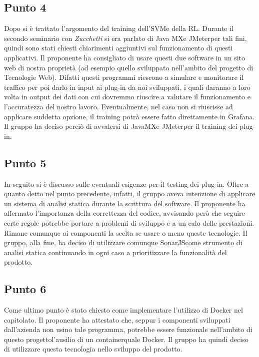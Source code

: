         \subsection{Punto 4}
            Dopo si è trattato l'argomento del training dell'SVM\glosp e della RL\glo. Durante il secondo seminario con \textit{Zucchetti} si era parlato di Java MX\glosp e JMeter\glosp per tali fini, quindi sono stati chiesti chiarimenti aggiuntivi sul funzionamento di questi applicativi. Il proponente ha consigliato di usare questi due software in un sito web di nostra proprietà (ad esempio quello sviluppato nell'ambito del progetto di Tecnologie Web). Difatti questi programmi riescono a simulare e monitorare il traffico per poi darlo in input ai plug-in da noi sviluppati, i quali daranno a loro volta in output dei dati con cui dovremmo riuscire a valutare il funzionamento e l'accuratezza del nostro lavoro. Eventualmente, nel caso non si riuscisse ad applicare suddetta opzione, il training potrà essere fatto direttamente in Grafana\glo. Il gruppo ha deciso perciò di avvalersi di JavaMX\glosp e JMeter\glosp per il training dei plug-in.
        \subsection{Punto 5}
            In seguito si è discusso sulle eventuali esigenze per il testing dei plug-in. Oltre a quanto detto nel punto precedente, infatti, il gruppo aveva intenzione di applicare un sistema di analisi statica durante la scrittura del software. Il proponente ha affermato l'importanza della correttezza del codice, avvisando però che seguire certe regole potrebbe portare a problemi di sviluppo e a un calo delle prestazioni. Rimane comunque ai componenti la scelta se usare o meno queste tecnologie. Il gruppo, alla fine, ha deciso di utilizzare comunque SonarJS\glosp come strumento di analisi statica continuando in ogni caso a prioritizzare la funzionalità del prodotto\glo.
        \subsection{Punto 6}
            Come ultimo punto è stato chiesto come implementare l'utilizzo di Docker nel capitolato\glo. Il proponente ha attestato che, seppur i componenti sviluppati dall'azienda non usino tale programma, potrebbe essere funzionale nell'ambito di questo progetto\glosp l'ausilio di un container\glosp quale Docker. Il gruppo ha quindi deciso di utilizzare questa tecnologia nello sviluppo del prodotto\glo.
